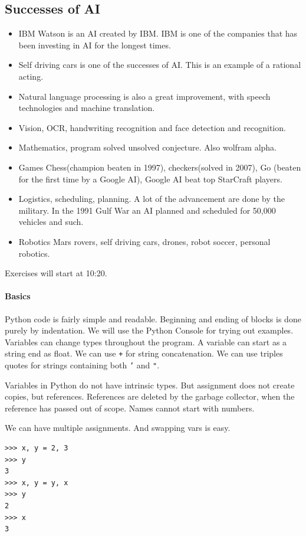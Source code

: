\documentclass{article}
\begin{document}
\subsection{Successes of AI}
\begin{itemize}
  \item IBM Watson is an AI created by IBM. IBM is one of the companies that has been
investing in AI for the longest times. 
  \item Self driving cars is one of the successes of AI. This is an example of a
  rational acting. 
  \item Natural language processing is also a great improvement, with speech
technologies and machine translation.
  \item Vision, OCR, handwriting recognition and face detection and recognition.
  \item Mathematics, program solved unsolved conjecture. Also wolfram alpha.
  \item Games
    \subitem Chess(champion beaten in 1997), checkers(solved in 2007), Go
    (beaten for the first time by a Google AI), Google AI beat top StarCraft
    players.
  \item Logistics, scheduling, planning.
    \subitem A lot of the advancement are done by the military. In the 1991 Gulf
    War an AI planned and scheduled for 50,000 vehicles and such.
  \item Robotics
    \subitem Mars rovers, self driving cars, drones, robot soccer, personal
    robotics.
\end{itemize}



Exercises will start at 10:20.
\paragraph{Basics}
Python code is fairly simple and readable. Beginning and ending of blocks is
done purely by indentation. We will use the Python Console for trying out
examples. Variables can change types throughout the program. A variable can
start as a string end as float. We can use \texttt{+} for string concatenation.
We can use triples quotes for strings containing both \texttt{'} and \texttt{"}.

Variables in Python do not have intrinsic types. But assignment does not create
copies, but references. References are deleted by the garbage collector, when
the reference has passed out of scope. Names cannot start with numbers.

We can have multiple assignments. And swapping vars is easy.
\begin{lstlisting}
>>> x, y = 2, 3
>>> y
3
>>> x, y = y, x
>>> y
2
>>> x
3
\end{lstlisting}
\end{document}
